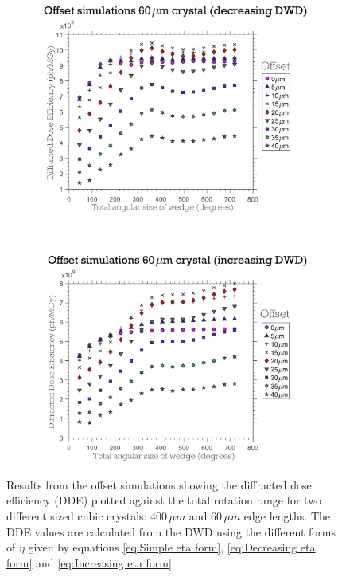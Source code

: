 \begin{figure}
    \ContinuedFloat
    \begin{subfigure}[b]{0.9\textwidth}
        \centering
        \includegraphics[width=\textwidth]{figures/dwd/OffsetSimulationDDMwrongCrystSize60.pdf}
        \caption{}
        \label{fig:Offset simulations 60 - Decreasing Eta}
    \end{subfigure}
    \\
    \begin{subfigure}[b]{0.9\textwidth}
        \centering
        \includegraphics[width=\textwidth]{figures/dwd/OffsetSimulationDDMnewCrystSize60.pdf}
        \caption{}
        \label{fig:Offset simulations 60 - Increasing Eta}
    \end{subfigure}
    \caption[Offset simulations comparing the diffracted dose efficiency against DWD with the different $\eta$ forms.]{Results from the offset simulations showing the diffracted dose efficiency (DDE) plotted against the total rotation range for two different sized cubic crystals: 400$\,\mu m$ and 60$\,\mu m$ edge lengths.
    The DDE values are calculated from the DWD using the different forms of $\eta$ given by equations \ref{eq:Simple eta form}, \ref{eq:Decreasing eta form} and \ref{eq:Increasing eta form}}
    \label{fig:Offset simulations}
\end{figure}

